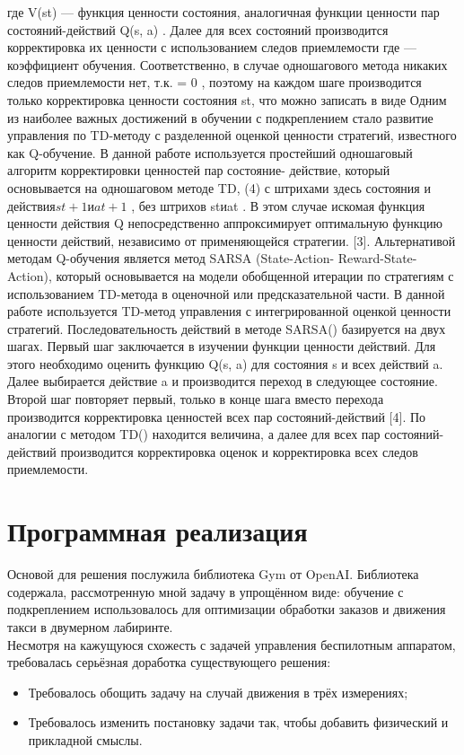 \documentclass[12pt, a4paper]{report}
\theoremstyle{definition}
\theoremstyle{plain}
\theoremstyle{remark}
\theoremstyle{remark}
\theoremstyle{definition}
\begin{document}
где V(st) — функция ценности состояния, аналогичная функции ценности пар состояний-действий Q(s, a) . Далее для всех состояний производится корректировка их ценности с использованием следов приемлемости где — коэффициент обучения. Соответственно, в случае одношагового метода никаких следов приемлемости нет, т.к.  = 0 , поэтому на каждом шаге производится только корректировка ценности состояния st, что можно записать в виде
Одним из наиболее важных достижений в обучении с подкреплением стало развитие управления по TD-методу с разделенной оценкой ценности стратегий, известного как Q-обучение. В данной работе используется простейший одношаговый алгоритм корректировки ценностей пар состояние- действие, который основывается на одношаговом методе TD, (4) с штрихами здесь состояния и действия$ st+1 иat+1 $ , без штрихов stиat . В этом случае искомая функция ценности действия Q непосредственно аппроксимирует оптимальную функцию ценности действий, независимо от применяющейся стратегии. [3].
Альтернативой методам Q-обучения является метод SARSA (State-Action- Reward-State-Action), который основывается на модели обобщенной итерации по стратегиям с использованием TD-метода в оценочной или предсказательной
части. В данной работе используется TD-метод управления с интегрированной оценкой ценности стратегий. Последовательность действий в методе SARSA() базируется на двух шагах. Первый шаг заключается в изучении функции ценности действий. Для этого необходимо оценить функцию Q(s, a) для состояния s и всех действий a. Далее выбирается действие a и производится переход в следующее состояние. Второй шаг повторяет первый, только в конце
шага вместо перехода производится корректировка ценностей всех пар состояний-действий [4]. По аналогии с методом TD() находится величина, а далее для всех пар состояний-действий производится корректировка оценок и корректировка всех следов приемлемости.

\section{Программная реализация}

Основой для решения послужила библиотека Gym от OpenAI. Библиотека содержала, рассмотренную мной задачу в упрощённом виде: обучение с подкреплением использовалось для оптимизации обработки заказов и движения такси в двумерном лабиринте.\\
Несмотря на кажущуюся схожесть с задачей управления беспилотным аппаратом, требовалась серьёзная доработка существующего решения:
\begin{itemize}
\item Требовалось обощить задачу на случай движения в трёх измерениях;
\item Требовалось изменить постановку задачи так, чтобы добавить физический и прикладной смыслы.
 \end{itemize}
\end{document}
